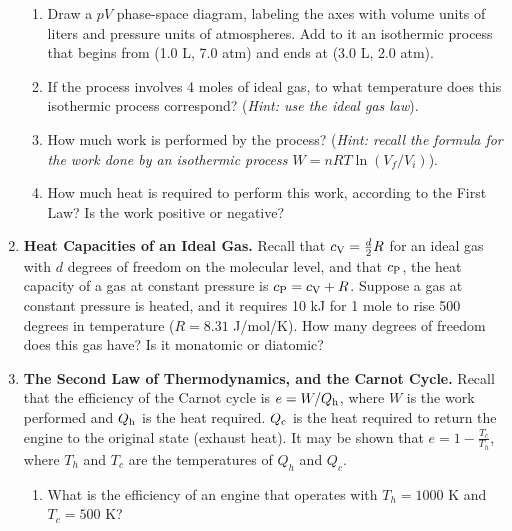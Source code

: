 \documentclass[10pt]{article}
\begin{document}
\begin{enumerate}
\begin{enumerate}
\item Draw a $pV$ phase-space diagram, labeling the axes with volume units of liters and pressure units of atmospheres.  Add to it an isothermic process that begins from (1.0 L, 7.0 atm) and ends at (3.0 L, 2.0 atm). \\ \vspace{3cm}
\item If the process involves 4 moles of ideal gas, to what temperature does this isothermic process correspond?  (\textit{Hint: use the ideal gas law}). \\ \vspace{2cm}
\item How much work is performed by the process?  (\textit{Hint: recall the formula for the work done by an isothermic process $W = nRT\ln(V_f/V_i)$}). \\ \vspace{2cm}
\item How much heat is required to perform this work, according to the First Law? Is the work positive or negative? \\ \vspace{2cm}
\end{enumerate}
\item \textbf{Heat Capacities of an Ideal Gas.} Recall that $c_{\rm V} = \frac{d}{2}R$ for an ideal gas with $d$ degrees of freedom on the molecular level, and that $c_{\rm P}$, the heat capacity of a gas at constant pressure is $c_{\rm P} = c_{\rm V} + R$.  Suppose a gas at constant pressure is heated, and it requires 10 kJ for 1 mole to rise 500 degrees in temperature ($R = 8.31$ J/mol/K).  How many degrees of freedom does this gas have?  Is it monatomic or diatomic? \\ \vspace{3cm}
\item \textbf{The Second Law of Thermodynamics, and the Carnot Cycle.}  Recall that the efficiency of the Carnot cycle is $e = W/Q_{\rm h}$, where $W$ is the work performed and $Q_{\rm h}$ is the heat required.  $Q_{\rm c}$ is the heat required to return the engine to the original state (exhaust heat).  It may be shown that $e = 1 - \frac{T_c}{T_h}$, where $T_h$ and $T_c$ are the temperatures of $Q_h$ and $Q_c$.
\begin{enumerate}
\item What is the efficiency of an engine that operates with $T_h = 1000$ K and $T_c = 500$ K? \\ \vspace{2cm}

\end{enumerate}
\end{enumerate}
\end{document}
